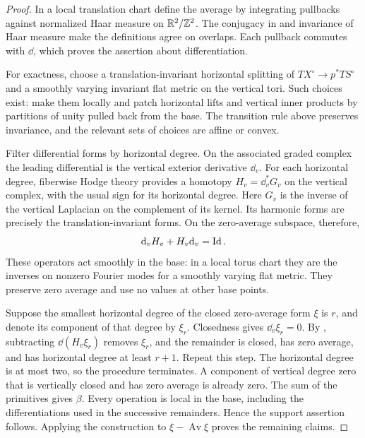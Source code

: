 \begin{proof}
In a local translation chart define the average by integrating pullbacks
against normalized Haar measure on $\mathbb R^2/\mathbb Z^2$.  The conjugacy in
 and invariance of Haar measure make
the definitions agree on overlaps.  Each pullback commutes with $\dd$,
which proves the assertion about differentiation.

For exactness, choose a translation-invariant horizontal splitting of
$TX^\circ\to p^*TS^\circ$ and a smoothly varying invariant flat metric
on the vertical tori.  Such choices exist: make them locally and patch
horizontal lifts and vertical inner products by partitions of unity
pulled back from the base.  The transition rule above preserves
invariance, and the relevant sets of choices are affine or convex.

Filter differential forms by horizontal degree.  On the associated
graded complex the leading differential is the vertical exterior
derivative $\dd_v$.  For each horizontal degree, fiberwise Hodge theory
\cite[Equations~(1.11)--(1.22)]{TaylorHodge2010}
provides a homotopy $H_v=\dd_v^*G_v$ on the vertical complex, with the
usual sign for its horizontal degree.  Here $G_v$ is the inverse of the
vertical Laplacian on the complement of its kernel.  Its harmonic forms
are precisely the translation-invariant forms.  On the zero-average
subspace, therefore,
\begin{equation}\label{eq:regular-vertical-homotopy}
 \mathrm d_v H_v+H_v\mathrm d_v=\operatorname{Id}.
\end{equation}
These operators act smoothly in the base: in a local torus chart they
are the inverses on nonzero Fourier modes for a smoothly varying flat
metric.  They preserve zero average and use no values at other base
points.

Suppose the smallest horizontal degree of the closed zero-average form
$\xi$ is $r$, and denote its component of that degree by $\xi_r$.
Closedness gives $\dd_v\xi_r=0$.  By
, subtracting
$\dd(H_v\xi_r)$ removes $\xi_r$, and the remainder is closed, has zero
average, and has horizontal degree at least $r+1$.  Repeat this step.
The horizontal degree is at most two, so the procedure terminates.  A
component of vertical degree zero that is vertically closed and has
zero average is already zero.  The sum of the primitives gives $\beta$.
Every operation is local in the base, including the differentiations
used in the successive remainders.  Hence the support assertion follows.
Applying the construction to $\xi-\operatorname{Av}\xi$ proves the
remaining claims.
\end{proof}

